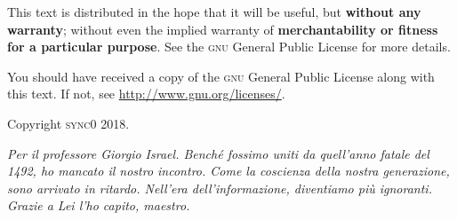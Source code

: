 This text is distributed in the hope that it will be useful, but \textbf{without
any warranty}; without even the implied warranty of \textbf{merchantability or 
fitness for a particular purpose}. See the \textsc{gnu} General 
Public License for more details.

You should have received a copy of the \textsc{gnu} General Public License along
with this text. If not, see \url{http://www.gnu.org/licenses/}.

\vspace{1\baselineskip}
\noindent
Copyright \textcopyright \textsc{sync0} 2018. 

\newpage\null\newpage

\begin{FlushRight}
\begin{italian}
\textit{Per il professore Giorgio Israel. \newline Benché fossimo uniti da quell'anno fatale del 1492, \linebreak ho mancato il nostro incontro. \linebreak Come la coscienza della nostra generazione, \linebreak sono arrivato in ritardo. \linebreak Nell'era dell'informazione, diventiamo più ignoranti. \linebreak Grazie a Lei l'ho capito, maestro.}
\end{italian}
\end{FlushRight}

\newpage
\tableofcontents 